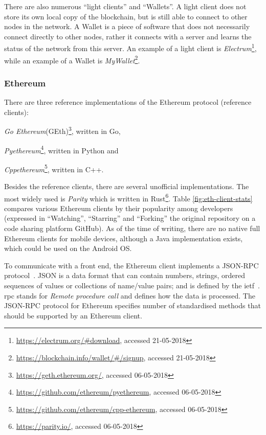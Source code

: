 There are also numerous ``light clients'' and ``Wallets''. A light client does not store its own local copy of the blockchain, but is still able to connect to other nodes in the network. A Wallet is a piece of software that does not necessarily connect directly to other nodes, rather it connects with a server and learns the status of the network from this server. An example of a light client is \textit{Electrum}\footnote{\url{https://electrum.org/\#download}, accessed 21-05-2018}, while an example of a Wallet is \textit{MyWallet}\footnote{\url{https://blockchain.info/wallet/\#/signup}, accessed 21-05-2018}.

\subsubsection{Ethereum}
There are three reference implementations of the Ethereum protocol (reference clients):
\begin{enumerate*}[label=(\roman*)]
    \item \textit{Go Ethereum}(GEth)\footnote{\url{https://geth.ethereum.org/}, accessed 06-05-2018}, written in Go,
    \item \textit{Pyethereum}\footnote{\url{https://github.com/ethereum/pyethereum}, accessed 06-05-2018}, written in Python and
    \item \textit{Cppethereum}\footnote{\url{https://github.com/ethereum/cpp-ethereum}, accessed 06-05-2018}, written in C++.
\end{enumerate*}
Besides the reference clients, there are several unofficial implementations. The most widely used is \textit{Parity} which is written in Rust\footnote{\url{https://parity.io/}, accessed 06-05-2018}. Table \ref{fig:eth-client-stats} compares various Ethereum clients by their popularity among developers (expressed in ``Watching'', ``Starring'' and ``Forking'' the original repository on a code sharing platform GitHub). As of the time of writing, there are no native full Ethereum clients for mobile devices, although a Java implementation exists, which could be used on the Android OS.

To communicate with a front end, the Ethereum client implements a JSON-RPC protocol~\cite{Dannen2017IntroducingSolidity}. JSON is a data format that can contain numbers, strings, ordered sequences of values or collections of name/value pairs; and is defined by the \acrshort{ietf}~\cite{Crockford2006TheJSON}. \acrshort{rpc} stands for \textit{Remote procedure call} and defines how the data is processed. The JSON-RPC protocol for Ethereum specifies number of standardised methods that should be supported by an Ethereum client\footnotemark.
% 
 
